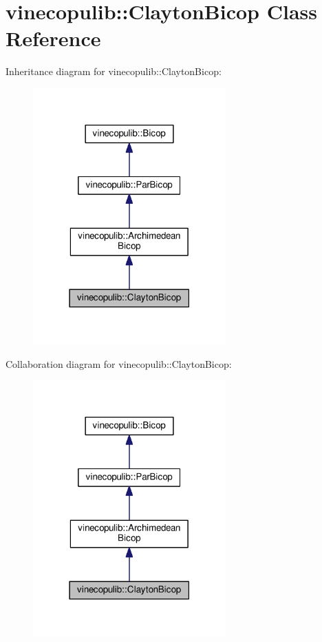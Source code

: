 \hypertarget{classvinecopulib_1_1_clayton_bicop}{}\section{vinecopulib\+:\+:Clayton\+Bicop Class Reference}
\label{classvinecopulib_1_1_clayton_bicop}


Inheritance diagram for vinecopulib\+:\+:Clayton\+Bicop\+:\nopagebreak
\begin{figure}[H]
\begin{center}
\leavevmode
\includegraphics[width=210pt]{classvinecopulib_1_1_clayton_bicop__inherit__graph}
\end{center}
\end{figure}


Collaboration diagram for vinecopulib\+:\+:Clayton\+Bicop\+:\nopagebreak
\begin{figure}[H]
\begin{center}
\leavevmode
\includegraphics[width=210pt]{classvinecopulib_1_1_clayton_bicop__coll__graph}
\end{center}
\end{figure}
